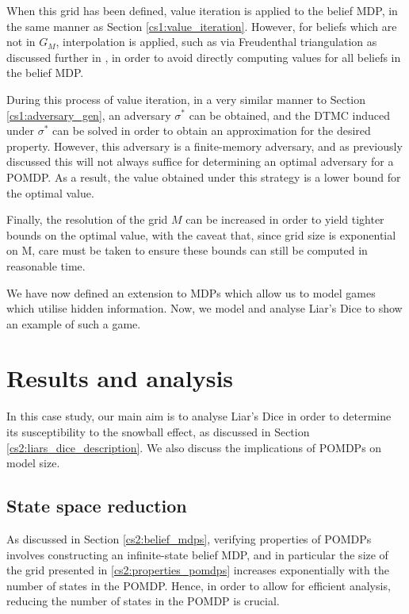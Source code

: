 When this grid has been defined, value iteration is applied to the belief MDP, in the same manner as Section \ref{cs1:value_iteration}. However, for beliefs which are not in $G_M$, interpolation is applied, such as via Freudenthal triangulation as discussed further in \cite{lovejoy_computationally_1991}, in order to avoid directly computing values for all beliefs in the belief MDP.

During this process of value iteration, in a very similar manner to Section \ref{cs1:adversary_gen}, an adversary $\sigma^*$ can be obtained, and the DTMC induced under $\sigma^*$ can be solved in order to obtain an approximation for the desired property. However, this adversary is a finite-memory adversary, and as previously discussed this will not always suffice for determining an optimal adversary for a POMDP. As a result, the value obtained under this strategy is a lower bound for the optimal value.

Finally, the resolution of the grid $M$ can be increased in order to yield tighter bounds on the optimal value, with the caveat that, since grid size is exponential on M, care must be taken to ensure these bounds can still be computed in reasonable time.

We have now defined an extension to MDPs which allow us to model games which utilise hidden information. Now, we model and analyse Liar's Dice to show an example of such a game.

\section{Results and analysis}

In this case study, our main aim is to analyse Liar's Dice in order to determine its susceptibility to the snowball effect, as discussed in Section \ref{cs2:liars_dice_description}. We also discuss the implications of POMDPs on model size.

\subsection{State space reduction}

As discussed in Section \ref{cs2:belief_mdps}, verifying properties of POMDPs involves constructing an infinite-state belief MDP, and in particular the size of the grid presented in \ref{cs2:properties_pomdps} increases exponentially with the number of states in the POMDP. Hence, in order to allow for efficient analysis, reducing the number of states in the POMDP is crucial.

